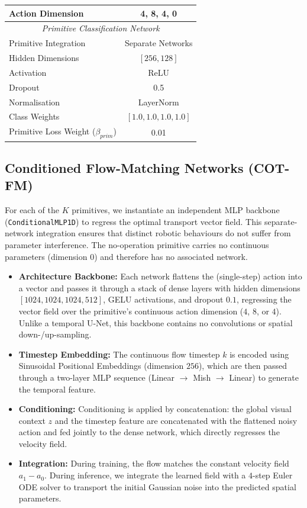 \documentclass[journal]{IEEEtran}
\begin{document}
\begin{table}[!t]
\begin{tabular}{lc}
Action Dimension & 4, 8, 4, 0 \\
\midrule
\multicolumn{2}{c}{\textit{Primitive Classification Network}} \\
\midrule
Primitive Integration & Separate Networks \\
Hidden Dimensions & $[256, 128]$ \\
Activation & ReLU \\
Dropout & 0.5 \\
Normalisation & LayerNorm \\
Class Weights & $[1.0, 1.0, 1.0, 1.0]$ \\
Primitive Loss Weight ($\beta_{prim}$) & 0.01 \\
\bottomrule
\end{tabular}
\end{table}



\subsection{Conditioned Flow-Matching Networks (COT-FM)}
For each of the $K$ primitives, we instantiate an independent MLP backbone (\texttt{ConditionalMLP1D}) to regress the optimal transport vector field. This separate-network integration ensures that distinct robotic behaviours do not suffer from parameter interference. The no-operation primitive carries no continuous parameters (dimension $0$) and therefore has no associated network.
\begin{itemize}
    \item \textbf{Architecture Backbone:} Each network flattens the (single-step) action into a vector and passes it through a stack of dense layers with hidden dimensions $[1024, 1024, 1024, 512]$, GELU activations, and dropout $0.1$, regressing the vector field over the primitive's continuous action dimension ($4$, $8$, or $4$). Unlike a temporal U-Net, this backbone contains no convolutions or spatial down-/up-sampling.
    \item \textbf{Timestep Embedding:} The continuous flow timestep $k$ is encoded using Sinusoidal Positional Embeddings (dimension $256$), which are then passed through a two-layer MLP sequence (Linear $\rightarrow$ Mish $\rightarrow$ Linear) to generate the temporal feature.
    \item \textbf{Conditioning:} Conditioning is applied by concatenation: the global visual context $z$ and the timestep feature are concatenated with the flattened noisy action and fed jointly to the dense network, which directly regresses the velocity field.
    \item \textbf{Integration:} During training, the flow matches the constant velocity field $a_1 - a_0$. During inference, we integrate the learned field with a $4$-step Euler ODE solver to transport the initial Gaussian noise into the predicted spatial parameters.
\end{itemize}
\end{document}
